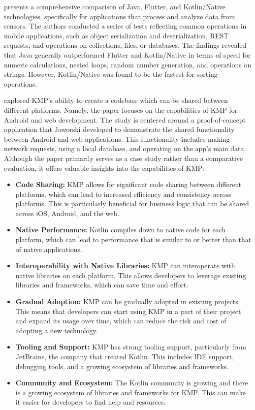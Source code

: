 \cite{Wasilewski.2021} presents a comprehensive comparison of Java, Flutter, and Kotlin/Native technologies, specifically for applications that process and analyze data from sensors. The authors conducted a series of tests reflecting common operations in mobile applications, such as object serialization and deserialization, REST requests, and operations on collections, files, or databases.
The findings revealed that Java generally outperformed Flutter and Kotlin/Native in terms of speed for numeric calculations, nested loops, random number generation, and operations on strings. However, Kotlin/Native was found to be the fastest for sorting operations.



\cite{Jaworski.2021} explored KMP's ability to create a codebase which can be shared between different platforms.  Namely, the paper focuses on the capabilities of KMP for Android and web development.  The study is centered around a proof-of-concept application that Jaworski developed to demonstrate the shared functionality between Android and web applications. This functionality includes making network requests, using a local database, and operating on the app's main data. Although the paper primarily serves as a case study rather than a comparative evaluation, it offers valuable insights into the capabilities of KMP: 
\begin{itemize}
    \item \textbf{Code Sharing:} KMP allows for significant code sharing between different platforms, which can lead to increased efficiency and consistency across platforms. This is particularly beneficial for business logic that can be shared across iOS, Android, and the web.
    
    \item \textbf{Native Performance:} Kotlin compiles down to native code for each platform, which can lead to performance that is similar to or better than that of native applications.
    
    \item \textbf{Interoperability with Native Libraries:} KMP can interoperate with native libraries on each platform. This allows developers to leverage existing libraries and frameworks, which can save time and effort.

    \item \textbf{Gradual Adoption:} KMP can be gradually adopted in existing projects. This means that developers can start using KMP in a part of their project and expand its usage over time, which can reduce the risk and cost of adopting a new technology.

    \item \textbf{Tooling and Support:} KMP has strong tooling support, particularly from JetBrains, the company that created Kotlin. This includes IDE support, debugging tools, and a growing ecosystem of libraries and frameworks.

    \item \textbf{Community and Ecosystem:} The Kotlin community is growing and there is a growing ecosystem of libraries and frameworks for KMP. This can make it easier for developers to find help and resources.
\end{itemize}
